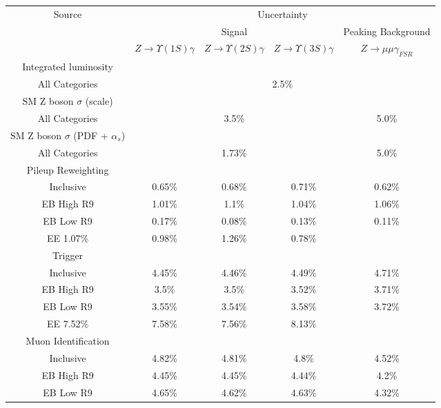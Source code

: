 
\begin{tabular}{c|c|c|c|c}
\cline{1-5}
\multirow{3}{*}{Source} & \multicolumn{4}{c}{Uncertainty} \\
\cline{2-5}
& \multicolumn{3}{c|}{Signal} & Peaking Background   \\
\cline{2-5}
& $Z \rightarrow \Upsilon(1S)  \gamma$ & $Z \rightarrow \Upsilon(2S)  \gamma$ & $Z \rightarrow \Upsilon(3S)  \gamma$ & $Z \rightarrow \mu\mu\gamma_{FSR}$  \\
\hline\hline
Integrated luminosity & \multicolumn{4}{l}{} \\ \hline
All Categories & \multicolumn{4}{c}{2.5\%} \\
\hline\hline
SM Z boson $\sigma$ (scale) & \multicolumn{4}{l}{} \\ \hline
All Categories & \multicolumn{3}{c|}{3.5\%}  & \multicolumn{1}{c}{5.0\%} \\
\hline\hline
SM Z boson $\sigma$ (PDF + $\alpha_s$)  & \multicolumn{4}{l}{} \\ \hline
All Categories & \multicolumn{3}{c|}{1.73\%}  & \multicolumn{1}{c}{5.0\%} \\
\hline\hline
Pileup Reweighting  & \multicolumn{4}{l}{} \\ \hline
Inclusive & 0.65\% & 0.68\% & 0.71\% & 0.62\% \\
EB High R9 & 1.01\% & 1.1\% & 1.04\% & 1.06\% \\
EB Low R9 & 0.17\% & 0.08\% & 0.13\% & 0.11\% \\
EE 1.07\% & 0.98\% & 1.26\% & 0.78\% \\
\hline\hline
Trigger  & \multicolumn{4}{l}{} \\ \hline
Inclusive & 4.45\% & 4.46\% & 4.49\% & 4.71\% \\
EB High R9 & 3.5\% & 3.5\% & 3.52\% & 3.71\% \\
EB Low R9 & 3.55\% & 3.54\% & 3.58\% & 3.72\% \\
EE 7.52\% & 7.58\% & 7.56\% & 8.13\% \\
\hline\hline
Muon Identification & \multicolumn{4}{l}{} \\ \hline
Inclusive & 4.82\% & 4.81\% & 4.8\% & 4.52\% \\
EB High R9 & 4.45\% & 4.45\% & 4.44\% & 4.2\% \\
EB Low R9 & 4.65\% & 4.62\% & 4.63\% & 4.32\% \\

\end{tabular}
